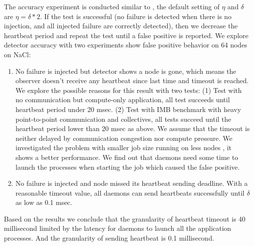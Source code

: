 \documentclass[sigconf]{acmart}
\begin{document}
The accuracy experiment is conducted similar to \cite{George18}, the default setting of $ \eta $ and $ \delta $ are $ \eta = \delta * 2 $. If the test is successful (no failure is detected when there is no injection, and all injected failure are correctly detected), then we decrease the heartbeat period and repeat the test until a false positive is reported. We explore detector accuracy with two experiments show false positive behavior on 64 nodes on NaCl: 
\begin{enumerate}
  \item No failure is injected but detector shows a node is gone, which means the observer doesn't receive any heartbeat since last time and timeout is reached. We explore the possible reasons for this result with two tests: (1) Test with no communication but compute-only application, all test succeeds until heartbeat period under 20 msec. (2) Test with IMB benchmark with heavy point-to-point communication and collectives, all tests succeed until the heartbeat period lower than 20 msec as above. We assume that the timeout is neither delayed by communication congestion nor compute pressure. We investigated the problem with smaller job size running on less nodes , it shows a better performance. We find out that daemons need some time to launch the processes when starting the job which caused the false positive. 
  \item No failure is injected and node missed its heartbeat sending deadline. With a reasonable timeout value, all daemons can send heartbeats successfully until $ \delta $ as low as 0.1 msec. 
\end{enumerate}

Based on the results we conclude that the granularity of heartbeat timeout is 40 millisecond limited by the latency for daemons to launch all the application processes. And the granularity of sending heartbeat is 0.1 millisecond.  
\end{document}
